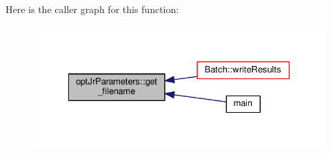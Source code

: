 Here is the caller graph for this function\-:\nopagebreak
\begin{figure}[H]
\begin{center}
\leavevmode
\includegraphics[width=328pt]{classoptJrParameters_a8dcc738e721b3df88c2622712ed83414_icgraph}
\end{center}
\end{figure}


